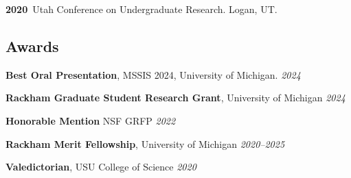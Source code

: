 \documentclass[11pt]{article}
\newenvironment {reflist}
                {
                 \begin{list}{}
                 {\setlength{\labelwidth}{0mm}
                  \setlength{\leftmargin}{8mm}
                  \setlength{\itemindent}{-3mm}
                  \setlength{\labelsep}{0mm}
                  \setlength{\parsep}{0.1 ex}
                  \setlength{\itemsep}{0.1cm}
      \setlength{\topsep}{0.15cm}}} %
   {\end{list}}
\begin{document}
\begin{reflist}
    \item \textbf{2020}\, Utah Conference on Undergraduate Research. Logan, UT.


\end{reflist}

\subsection*{Awards}

\noindent\hspace{5mm}\textbf{Best Oral Presentation}, MSSIS 2024, University of Michigan. \hfill {\textit{2024}}

\hspace{5mm}{\it Award amount: $\$200$}


\vspace{2mm}
\noindent\hspace{5mm}\textbf{Rackham Graduate Student Research Grant}, University of Michigan \hfill {\textit{2024}}

\hspace{5mm}{\it Award amount: $\$2500$}

\vspace{2mm}
\noindent\hspace{5mm}\textbf{Honorable Mention} NSF GRFP \hfill {\textit{2022}}

\vspace{2mm}
\noindent\hspace{5mm}\textbf{Rackham Merit Fellowship}, University of Michigan \hfill {\textit{2020--2025}}

\hspace{5mm}{\it Award amount: Three years of PhD student funding.}

\vspace{2mm}
\noindent\hspace{5mm}\textbf{Valedictorian}, USU College of Science \hfill {\textit{2020}}
\end{document}
